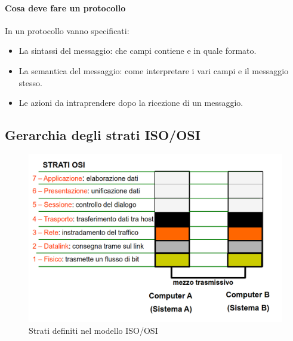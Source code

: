 \paragraph{Cosa deve fare un protocollo} In un protocollo vanno specificati:
\begin{itemize}
    \item La sintassi del messaggio: che campi contiene e in quale formato.
    \item La semantica del messaggio: come interpretare i vari campi e il messaggio stesso.
    \item Le azioni da intraprendere dopo la ricezione di un messaggio.
\end{itemize}

\newpage

\subsection{Gerarchia degli strati ISO/OSI}
\begin{figure}[h]
    \centering
    \includegraphics[scale=0.34]{Immagini/Strati_modello_ISO-OSI.png}
    \caption{Strati definiti nel modello ISO/OSI}
\end{figure}
